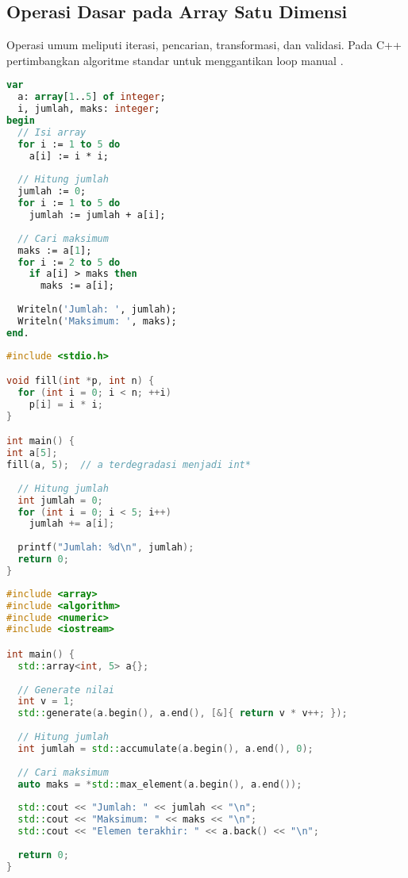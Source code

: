 \documentclass[../main.tex]{subfiles}
\begin{document}
\subsection{Operasi Dasar pada Array Satu Dimensi}
Operasi umum meliputi iterasi, pencarian, transformasi, dan validasi. Pada C++ pertimbangkan algoritme standar untuk menggantikan loop manual \parencite{cppreference-algorithm,gnu-c-manual}.

\begin{lstlisting}[language=Pascal, caption={Operasi dasar array di Pascal}]
var
  a: array[1..5] of integer;
  i, jumlah, maks: integer;
begin
  // Isi array
  for i := 1 to 5 do
    a[i] := i * i;
    
  // Hitung jumlah
  jumlah := 0;
  for i := 1 to 5 do
    jumlah := jumlah + a[i];
    
  // Cari maksimum
  maks := a[1];
  for i := 2 to 5 do
    if a[i] > maks then
      maks := a[i];
      
  Writeln('Jumlah: ', jumlah);
  Writeln('Maksimum: ', maks);
end.
\end{lstlisting}

\begin{lstlisting}[language=C, caption={Operasi dasar array di C}]
#include <stdio.h>

void fill(int *p, int n) {
  for (int i = 0; i < n; ++i)
    p[i] = i * i;
}

int main() {
int a[5];
fill(a, 5);  // a terdegradasi menjadi int*
  
  // Hitung jumlah
  int jumlah = 0;
  for (int i = 0; i < 5; i++)
    jumlah += a[i];
    
  printf("Jumlah: %d\n", jumlah);
  return 0;
}
\end{lstlisting}

\begin{lstlisting}[language=C++, caption={Operasi dengan std::array dan algoritme}]
#include <array>
#include <algorithm>
#include <numeric>
#include <iostream>

int main() {
  std::array<int, 5> a{};
  
  // Generate nilai
  int v = 1;
  std::generate(a.begin(), a.end(), [&]{ return v * v++; });
  
  // Hitung jumlah
  int jumlah = std::accumulate(a.begin(), a.end(), 0);
  
  // Cari maksimum
  auto maks = *std::max_element(a.begin(), a.end());
  
  std::cout << "Jumlah: " << jumlah << "\n";
  std::cout << "Maksimum: " << maks << "\n";
  std::cout << "Elemen terakhir: " << a.back() << "\n";
  
  return 0;
}
\end{lstlisting}
\end{document}
